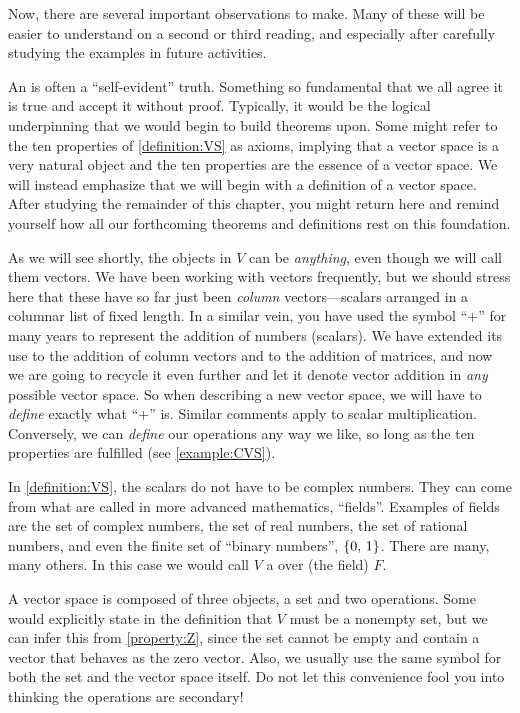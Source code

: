 \documentclass{ximera}
\begin{document}
Now, there are several important observations to make.  Many of these
will be easier to understand on a second or third reading, and
especially after carefully studying the examples in future activities.

An  is often a ``self-evident'' truth.  Something so
fundamental that we all agree it is true and accept it without proof.
Typically, it would be the logical underpinning that we would begin to
build theorems upon.  Some might refer to the ten properties of
\ref{definition:VS} as axioms, implying that a vector space is a very
natural object and the ten properties are the essence of a vector
space.  We will instead emphasize that we will begin with a definition
of a vector space.  After studying the remainder of this chapter, you
might return here and remind yourself how all our forthcoming theorems
and definitions rest on this foundation.

As we will see shortly, the objects in $V$ can be \textit{anything},
even though we will call them vectors.  We have been working with
vectors frequently, but we should stress here that these have so far
just been \textit{column} vectors---scalars arranged in a columnar
list of fixed length.  In a similar vein, you have used the symbol
``+'' for many years to represent the addition of numbers (scalars).
We have extended its use to the addition of column vectors and to the
addition of matrices, and now we are going to recycle it even further
and let it denote vector addition in \textit{any} possible vector
space.  So when describing a new vector space, we will have to
\textit{define} exactly what ``+'' is.  Similar comments apply to
scalar multiplication.  Conversely, we can \textit{define} our
operations any way we like, so long as the ten properties are
fulfilled (see \ref{example:CVS}).

In \ref{definition:VS}, the scalars do not have to be complex numbers.
They can come from what are called in more advanced mathematics,
``fields''.  Examples of fields are the set of complex numbers, the
set of real numbers, the set of rational numbers, and even the finite
set of ``binary numbers'', $\left\{0,\,1\right\}$.  There are many, many
others.  In this case we would call $V$ a  over (the
field) $F$.

A vector space is composed of three objects, a set and two operations.
Some would explicitly state in the definition that $V$ must be a
nonempty set, but we can infer this from \ref{property:Z}, since the
set cannot be empty and contain a vector that behaves as the zero
vector.  Also, we usually use the same symbol for both the set and the
vector space itself.  Do not let this convenience fool you into
thinking the operations are secondary!
\end{document}
